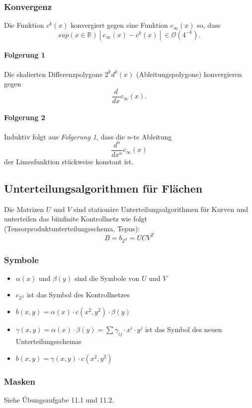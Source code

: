 \subsubsection{Konvergenz}
Die Funktion \(c^k(x)\) konvergiert gegen eine Funktion \(c_{\infty}(x)\) so, dass
\[sup(x \in \mathbb{R})~|~c_{\infty}(x) - c^k(x)~|~\in \mathcal{O}(4^{-k}).\]

\paragraph{Folgerung 1}
Die skalierten Differenzpolygone \(2^k d^k(x)\) (Ableitungspolygone) konvergieren gegen
\[\frac{d}{dx} c_{\infty}(x).\]

\paragraph{Folgerung 2}
Induktiv folgt aus \textit{Folgerung 1}, dass die \(n\)-te Ableitung
\[\frac{d^n}{dx^n} c_{\infty}(x)\]
der Limesfunktion stückweise konstant ist.


\subsection{Unterteilungsalgorithmen für Flächen}
Die Matrizen \(U\) und \(V\) sind stationäre Unterteilungsalgorithmen für Kurven und unterteilen das biinfinite Kontrollnetz wie folgt (Tensorproduktunterteilungsschema, Tepus):
\[B = b_{\mathbb{Z}^2} = UCV^T\]

\subsubsection{Symbole}
\begin{itemize}
	\item \(\alpha(x)\) und \(\beta(y)\) sind die Symbole von \(U\) und \(V\)
	\item \(c_{\mathbb{Z}^2}\) ist das Symbol des Kontrollnetzes
	\item \(b(x,y) = \alpha(x) \cdot c(x^2,y^2) \cdot \beta(y)\)
	\item \(\gamma(x,y) = \alpha(x) \cdot \beta(y) = \sum \gamma_{ij} \cdot x^i \cdot y^j\) ist das Symbol des neuen Unterteilungsschemas
	\item \(b(x,y) = \gamma(x,y) \cdot c(x^2,y^2)\)
\end{itemize}

\subsubsection{Masken}
Siehe Übungsaufgabe 11.1 und 11.2.


